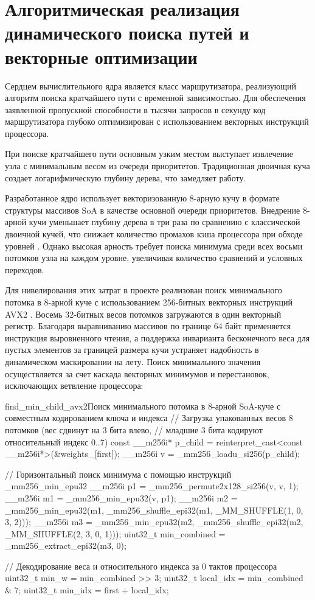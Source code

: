 \section{Алгоритмическая реализация динамического поиска путей и векторные оптимизации}

Сердцем вычислительного ядра является класс маршрутизатора, реализующий алгоритм поиска кратчайшего пути с временной зависимостью. Для обеспечения заявленной пропускной способности в тысячи запросов в секунду код маршрутизатора глубоко оптимизирован с использованием векторных инструкций процессора.

При поиске кратчайшего пути основным узким местом выступает извлечение узла с минимальным весом из очереди приоритетов. Традиционная двоичная куча создает логарифмическую глубину дерева, что замедляет работу.

Разработанное ядро использует векторизованную 8-арную кучу в формате структуры массивов SoA в качестве основной очереди приоритетов. Внедрение 8-арной кучи уменьшает глубину дерева в три раза по сравнению с классической двоичной кучей, что снижает количество промахов кэша процессора при обходе уровней \cite{outerloop_heap}. Однако высокая арность требует поиска минимума среди всех восьми потомков узла на каждом уровне, увеличивая количество сравнений и условных переходов.

Для нивелирования этих затрат в проекте реализован поиск минимального потомка в 8-арной куче с использованием 256-битных векторных инструкций AVX2 \cite{kusswurm2014modern, fog_optimizing_cpp}. Восемь 32-битных весов потомков загружаются в один векторный регистр. Благодаря выравниванию массивов по границе 64 байт применяется инструкция выровненного чтения, а поддержка инварианта бесконечного веса для пустых элементов за границей размера кучи устраняет надобность в динамическом маскировании на лету. Поиск минимального значения осуществляется за счет каскада векторных минимумов и перестановок, исключающих ветвление процессора:

\begin{plaincode}{find_min_child_avx2}{Поиск минимального потомка в 8-арной SoA-куче с совместным кодированием ключа и индекса}
// Загрузка упакованных весов 8 потомков (вес сдвинут на 3 бита влево, 
// младшие 3 бита кодируют относительный индекс 0..7)
const __m256i* p_child = reinterpret_cast<const __m256i*>(&weights_[first]);
__m256i v = _mm256_loadu_si256(p_child);

// Горизонтальный поиск минимума с помощью инструкций _mm256_min_epu32
__m256i p1 = _mm256_permute2x128_si256(v, v, 1);
__m256i m1 = _mm256_min_epu32(v, p1);
__m256i m2 = _mm256_min_epu32(m1, _mm256_shuffle_epi32(m1, _MM_SHUFFLE(1, 0, 3, 2)));
__m256i m3 = _mm256_min_epu32(m2, _mm256_shuffle_epi32(m2, _MM_SHUFFLE(2, 3, 0, 1)));
uint32_t min_combined = _mm256_extract_epi32(m3, 0);

// Декодирование веса и относительного индекса за 0 тактов процессора
uint32_t min_w = min_combined >> 3;
uint32_t local_idx = min_combined & 7;
uint32_t min_idx = first + local_idx;
\end{plaincode}

